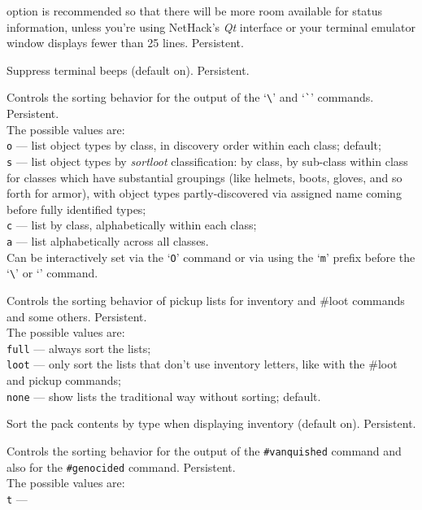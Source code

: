 \documentclass[titlepage]{article}
\begin{document}
\begin{description}[font=\mdseries\itshape]
option is recommended so that there will be more room available for
status information, unless you're using NetHack's \textit{Qt} interface
or your terminal emulator window displays fewer than 25 lines.
Persistent.
\item[silent]
Suppress terminal beeps (default on).  Persistent.
\item[sortdiscoveries]
Controls the sorting behavior for the output of the `\texttt{\textbackslash}'
and `\texttt{\`{}}' commands.
Persistent.
\\
The possible values are:
\\
\texttt{o} --- list object types by class, in discovery order within each class;
default;
\\
\texttt{s} --- list object types by \textit{sortloot}
classification: by class, by sub-class within class for classes which
have substantial groupings (like helmets, boots, gloves, and so forth
for armor), with object types partly-discovered via assigned name coming
before fully identified types;
\\
\texttt{c} --- list by class, alphabetically within each class;\\
\texttt{a} --- list alphabetically across all classes.\\
Can be interactively set via the `\texttt{O}' command or via using
the `\texttt{m}' prefix before the `\texttt{\textbackslash}'
or `\texttt{\textasciigrave}' command.
\item[sortloot]
Controls the sorting behavior of pickup lists for inventory
and \#loot commands and some others.  Persistent.
\\
The possible values are:
\\
\texttt{full} --- always sort the lists;\\
\texttt{loot} --- only sort the lists that don't use inventory
       letters, like with the \#loot and pickup commands;\\
\texttt{none} --- show lists the traditional way without sorting; default.
\item[sortpack]
Sort the pack contents by type when displaying inventory (default on).
Persistent.
\item[sortvanquished]
Controls the sorting behavior for the output of the \texttt{\#vanquished} command
and also for the \texttt{\#genocided} command.
Persistent.
\\
The possible values are:
\\
\texttt{t} ---

\end{description}
\end{document}

